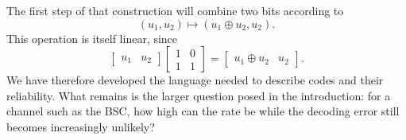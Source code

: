 The first step of that construction will combine two bits according to
\[
(u_1,u_2)\longmapsto(u_1\oplus u_2,u_2).
\]
This operation is itself linear, since
\[
\begin{bmatrix}u_1&u_2\end{bmatrix}
\begin{bmatrix}
1&0\\
1&1
\end{bmatrix}
=
\begin{bmatrix}u_1\oplus u_2&u_2\end{bmatrix}.
\]
We have therefore developed the language needed to describe codes and their reliability. What remains is the larger question posed in the introduction: for a channel such as the BSC, how high can the rate be while the decoding error still becomes increasingly unlikely?
